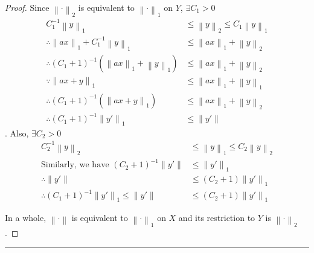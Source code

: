 \documentclass{article}
\newcommand{\norm}[1]{\left\|#1\right\|}
\begin{document}
\begin{proof}
    Since $\norm{\cdot}_2$ is equivalent to $\norm{\cdot}_1$ on $Y$, $\exists C_1 > 0$
    \begin{align}
        C_1^{-1} \norm{y}_1 
        &\leq \norm{y}_2 
        \leq C_1 \norm{y}_1
        \\
        \therefore 
        \norm{a x}_1 + C_1 ^ {-1} \norm{y}_1
        &\leq \norm{a x}_1 + \norm{y}_2
        \\
        \therefore 
        (C_1 + 1)^{-1}(\norm{a x}_1 + \norm{y}_1)
        &\leq \norm{a x}_1 + \norm{y}_2
        \\
        \because
        \norm{a x + y}_1
        &\leq \norm{a x}_1 + \norm{y}_1
        \\
        \therefore 
        (C_1 + 1)^{-1}(\norm{a x + y}_1)
        &\leq \norm{a x}_1 + \norm{y}_2
        \\
        \therefore 
        (C_1 + 1)^{-1}\norm{y'}_1
        &\leq \norm{y'}
    \end{align}
    . Also, $\exists C_2 > 0$
    \begin{align}
        C_2^{-1} \norm{y}_2
        &\leq \norm{y}_1 
        \leq C_2 \norm{y}_2
        \\
        \text{Similarly, we have }
        (C_2 + 1)^{-1}\norm{y'}
        &\leq \norm{y'}_1
        \\
        \therefore 
        \norm{y'}
        &\leq (C_2 + 1) \norm{y'}_1
        \\
        \therefore 
        (C_1 + 1)^{-1}\norm{y'}_1
        \leq \norm{y'}
        &\leq (C_2 + 1) \norm{y'}_1
    \end{align}

    In a whole, $\norm{\cdot}$ is equivalent to $\norm{\cdot}_1$ on $X$ and its restriction to $Y$ is $\norm{\cdot}_2$.


\end{proof}


\hrule
\vspace{0.5em}
\end{document}
